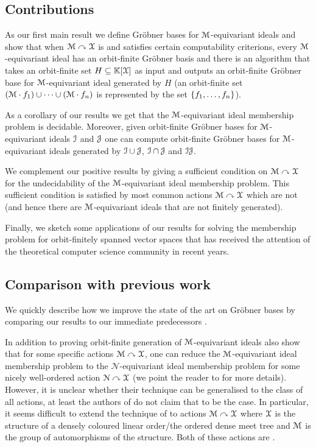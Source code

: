 \subsection{Contributions}

As our first main result we define Gr\"{o}bner bases for $\mathcal{M}$-equivariant ideals and show that when $\mathcal{M}\curvearrowright\mathcal{X}$ is  and satisfies certain computability criterions,
every $\mathcal{M}$-equivariant ideal has an orbit-finite Gr\"{o}bner basis and
there is an algorithm that takes an orbit-finite set $H\subseteq\mathbb{K}[\mathcal{X}]$ as input and outputs an orbit-finite Gr\"{o}bner base for $\mathcal{M}$-equivariant ideal generated by $H$ (an orbit-finite set
$(\mathcal{M}\cdot f_1)\cup\dots\cup(\mathcal{M}\cdot f_n)$ is represented by the set $\{ f_1,\dots,f_n \}$).

As a corollary of our results we get that the $\mathcal{M}$-equivariant ideal membership problem is decidable.
Moreover, given orbit-finite Gr\"{o}bner bases for $\mathcal{M}$-equivariant ideals $\idl[I]$ and $\idl[J]$ one can compute orbit-finite Gr\"{o}bner bases for $\mathcal{M}$-equivariant ideals generated by $\idl[I]\cup\idl[J]$, $\idl[I]\cap\idl[J]$ and $\idl[I]\idl[J]$.

We complement our positive results by giving a sufficient condition on $\mathcal{M}\curvearrowright\mathcal{X}$ for the undecidability of the $\mathcal{M}$-equivariant ideal membership problem.
This sufficient condition is satisfied by most common actions $\mathcal{M}\curvearrowright\mathcal{X}$ which are not  (and hence there are $\mathcal{M}$-equivariant ideals that are not finitely generated). 

Finally, we sketch some applications of our results for solving the membership problem for orbit-finitely spanned vector spaces that has received the attention of the theoretical computer science community in recent years.
%
\subsection{Comparison with previous work}
%
We quickly describe how we improve the state of the art on Gr\"{o}bner bases by comparing our results to our immediate predecessors \cite{GHOLAS24,BRDR11}.

In addition to proving orbit-finite generation of $\mathcal{M}$-equivariant ideals \cite{GHOLAS24} also show that for some specific  actions $\mathcal{M}\curvearrowright\mathcal{X}$,
one can reduce the $\mathcal{M}$-equivariant ideal membership problem to the $\mathcal{N}$-equivariant ideal membership problem for some nicely well-ordered action $\mathcal{N}\curvearrowright\mathcal{X}$
(we point the reader to  for more details).
However, it is unclear whether their technique can be generalised to the class of all  actions,
at least the authors of \cite{GHOLAS24} do not claim that to be the case.
In particular, it seems difficult to extend the technique of \cite{GHOLAS24} to actions $\mathcal{M}\curvearrowright\mathcal{X}$ where $\mathcal{X}$ is the structure of a densely coloured linear order/the ordered dense meet tree and $\mathcal{M}$ is the group of automorphisms of the structure.
Both of these actions are .
 
